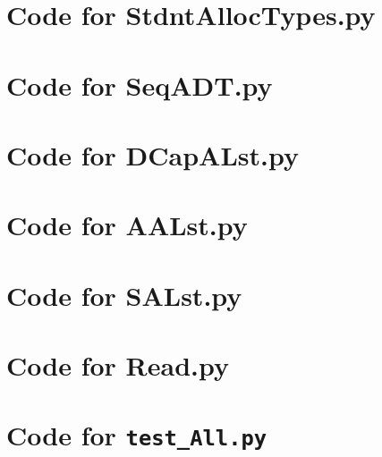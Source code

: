 \documentclass[12pt]{article}
\begin{document}
\newpage

\lstset{language=Python, basicstyle=\tiny, breaklines=true, showspaces=false,
  showstringspaces=false, breakatwhitespace=true}

\def\thesection{\Alph{section}}

\section{Code for StdntAllocTypes.py}

\noindent 

\newpage

\section{Code for SeqADT.py}

\noindent 

\newpage

\section{Code for DCapALst.py}

\noindent 

\newpage

\section{Code for AALst.py}

\noindent 

\newpage

\section{Code for SALst.py}

\noindent 

\newpage

\section{Code for Read.py}

\noindent 

\newpage

\section{Code for {\tt test\_All.py}}
\end{document}
